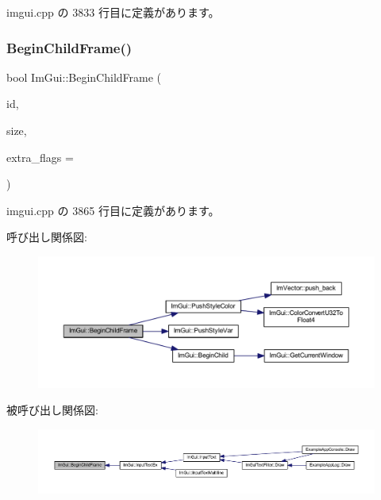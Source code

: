  imgui.\+cpp の 3833 行目に定義があります。

\mbox{\label{namespace_im_gui_a26d6981a769d3fbe9be9a25975b5dc6b}} 
\subsubsection{\texorpdfstring{Begin\+Child\+Frame()}{BeginChildFrame()}}
{\footnotesize\ttfamily bool Im\+Gui\+::\+Begin\+Child\+Frame (\begin{DoxyParamCaption}\item[{\mbox{\hyperlink{imgui_8h_a1785c9b6f4e16406764a85f32582236f}{Im\+Gui\+ID}}}]{id,  }\item[{const \mbox{\hyperlink{struct_im_vec2}{Im\+Vec2}} \&}]{size,  }\item[{\mbox{\hyperlink{imgui_8h_a0b8e067ab4f7a818828c8d89e531addc}{Im\+Gui\+Window\+Flags}}}]{extra\+\_\+flags = {} }\end{DoxyParamCaption})}



 imgui.\+cpp の 3865 行目に定義があります。

呼び出し関係図\+:\nopagebreak
\begin{figure}[H]
\begin{center}
\leavevmode
\includegraphics[width=350pt]{namespace_im_gui_a26d6981a769d3fbe9be9a25975b5dc6b_cgraph}
\end{center}
\end{figure}
被呼び出し関係図\+:\nopagebreak
\begin{figure}[H]
\begin{center}
\leavevmode
\includegraphics[width=350pt]{namespace_im_gui_a26d6981a769d3fbe9be9a25975b5dc6b_icgraph}
\end{center}
\end{figure}
\mbox{\label{namespace_im_gui_a4b0c247a5d091c5921c58de6bc8215aa}} 
